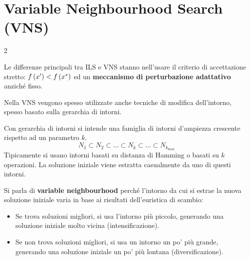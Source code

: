 \documentclass[\main/main.tex]{subfiles}
\begin{document}
\section{Variable Neighbourhood Search (VNS)}
\begin{multicols}{2}
\begin{observation}
    Le differenze principali tra ILS e VNS stanno nell'usare il criterio di accettazione stretto: \(f\left(x'\right) < f\left(x^*\right)\) ed un \textbf{meccanismo di perturbazione adattativo} anziché fisso.

    Nella VNS vengono spesso utilizzate anche tecniche di modifica dell'intorno, spesso basato sulla gerarchia di intorni.
\end{observation}

\begin{definition}
    Con gerarchia di intorni si intende una famiglia di intorni d'ampiezza crescente rispetto ad un parametro \(k\).
    \[
        N_1 \subset N_2 \subset \ldots \subset N_k \subset \ldots \subset N_{k_{\max}}
    \]
    Tipicamente si usano intorni basati su distanza di Hamming o basati su \(k\) operazioni. La soluzione iniziale viene estratta casualmente da uno di questi intorni.
\end{definition}
\begin{definition}
    Si parla di \textbf{variable neighbourhood} perché l'intorno da cui si estrae la nuova soluzione iniziale varia in base ai risultati dell'euristica di scambio:
    \begin{itemize}
        \item Se trova soluzioni migliori, si usa l'intorno più piccolo, generando una soluzione iniziale molto vicina (intensificazione).
        \item Se non trova soluzioni migliori, si usa un intorno un po' più grande, generando una soluzione iniziale un po' più lontana (diversificazione).
    \end{itemize}
    

\end{definition}
\end{multicols}
\end{document}

